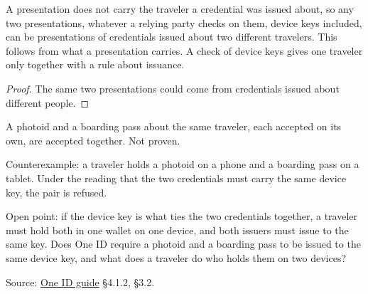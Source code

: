 \begin{theorem}
  \label{thm:no-presentation-check}
  A presentation does not carry the traveler a credential was issued about, so
  any two presentations, whatever a relying party checks on them, device keys
  included, can be presentations of credentials issued about two different
  travelers.  This follows from what a presentation carries.  A check of
  device keys gives one traveler only together with a rule about issuance.
\end{theorem}
\begin{proof}
  The same two presentations could come from credentials issued about different people.
\end{proof}

\begin{theorem}
  \label{thm:same-traveler-pair-accepted}
  A photoid and a boarding pass about the same traveler, each accepted on its
  own, are accepted together.  Not proven.

  Counterexample: a traveler holds a photoid on a phone and a boarding pass on
  a tablet.  Under the reading that the two credentials must carry the same
  device key, the pair is refused.

  Open point: if the device key is what ties the two credentials together, a
  traveler must hold both in one wallet on one device, and both issuers must
  issue to the same key.  Does One ID require a photoid and a boarding pass to
  be issued to the same device key, and what does a traveler do who holds them
  on two devices?

  Source: \href{https://standards.atlassian.net/wiki/spaces/OneID/pages/2947416082/Technical+Implementation+Guide}{One ID guide} §4.1.2, §3.2.
\end{theorem}

